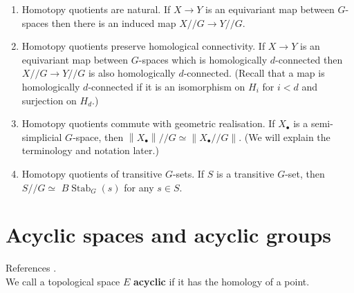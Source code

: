\begin{enumerate}
    \item Homotopy quotients are natural. If $X \rightarrow Y$ is an equivariant map between $G$-spaces then there is an induced map $X / / G \rightarrow Y / / G$.
    \item Homotopy quotients preserve homological connectivity. If $X \rightarrow Y$ is an equivariant map between $G$-spaces which is homologically $d$-connected then $X / / G \rightarrow Y / / G$ is also homologically $d$-connected. (Recall that a map is homologically $d$-connected if it is an isomorphism on $H_i$ for $i<d$ and surjection on $H_d$.)
    \item Homotopy quotients commute with geometric realisation. If $X_{\bullet}$ is a semi-simplicial $G$-space, then $\left\|X_{\bullet}\right\| / / G \simeq\left\|X_{\bullet} / / G\right\|$. (We will explain the terminology and notation later.)
    \item Homotopy quotients of transitive $G$-sets. If $S$ is a transitive $G$-set, then $S / / G \simeq$ $B \operatorname{Stab}_G(s)$ for any $s \in S$.
\end{enumerate}


\section{Acyclic spaces and acyclic groups}

References \cite{karoubiContemporaryDevelopmentsAlgebraic2003,srinivasAlgebraicKTheory1996,weibelKbookIntroductionAlgebraic2013a}.\\

 We call a topological space $E$ \textbf{acyclic} if it has the homology of a point.

